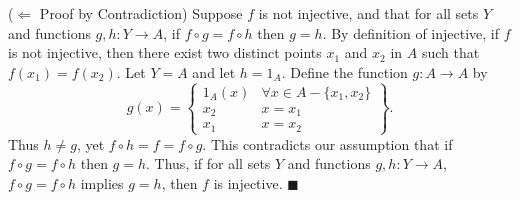 \documentclass{article}
\theoremstyle{definition}
\begin{document}
	($\Leftarrow$ Proof by Contradiction)  Suppose $f$ is not injective,
	and that for all sets $Y$ and functions $g,h:Y\rightarrow A$, if
	$f\circ g=f\circ h$ then $g=h$. By definition of injective, if $f$
	is not injective, then there exist two distinct points $x_1$ and
	$x_2$ in $A$ such that $f(x_1)=f(x_2)$. Let $Y=A$ and let $h=1_A$.
	Define the function $g:A\rightarrow A$ by
	$$g(x)=\left\{\begin{array}{cc}
					  1_A(x) & \forall x\in
					  A-\{x_1,x_2\}\\ x_2 & x=x_1\\
					  x_1 & x=x_2
	\end{array}\right\}.$$ Thus $h\not= g$, yet $f\circ h=f=f\circ
	g$. This contradicts our assumption that if $f\circ g=f\circ h$
	then $g=h$. Thus, if for all sets $Y$ and functions
	$g,h:Y\rightarrow A$, $f\circ g=f\circ h$ implies $g=h$, then $f$ is
	injective.  $\blacksquare$

	\vspace{1cm}


\end{document}
